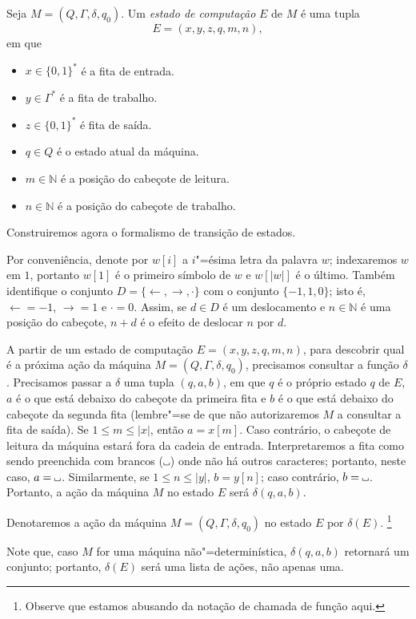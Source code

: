 \begin{definition}
    Seja $M = (Q, \Gamma, \delta, q_0)$.
    Um \emph{estado de computação} $E$ de $M$ é uma tupla
    \begin{equation*}
        E = (x, y, z, q, m, n),
    \end{equation*}
    em que
    \begin{itemize}
        \setlength{\labelsep}{1ex}
        \item $x \in \{0, 1\}^*$ é a fita de entrada.
        \item $y \in \Gamma^*$ é a fita de trabalho.
        \item $z \in \{0, 1\}^*$ é fita de saída.
        \item $q \in Q$ é o estado atual da máquina.
        \item $m \in \mathbb N$ é a posição do cabeçote de leitura.
        \item $n \in \mathbb N$ é a posição do cabeçote de trabalho.
    \end{itemize}
\end{definition}

Construiremos agora o formalismo de transição de estados.

Por conveniência, denote por $w[i]$ a $i$"=ésima letra da palavra $w$;
indexaremos $w$ em $1$,
portanto $w[1]$ é o primeiro símbolo de $w$ e $w[|w|]$ é o último.
Também identifique o conjunto $D = \{\leftarrow, \rightarrow, \cdot\}$
com o conjunto $\{-1, 1, 0\}$;
isto é, $\leftarrow = -1$, $\rightarrow = 1$ e $\cdot = 0$.
Assim, se $d \in D$ é um deslocamento
e $n \in \mathbb N$ é uma posição do cabeçote,
$n + d$ é o efeito de deslocar $n$ por $d$.

A partir de um estado de computação $E = (x, y, z, q, m, n)$,
para descobrir qual é a próxima ação da máquina $M = (Q, \Gamma, \delta, q_0)$,
precisamos consultar a função $\delta$.
Precisamos passar a $\delta$ uma tupla $(q, a, b)$,
em que $q$ é o próprio estado $q$ de $E$,
$a$ é o que está debaixo do cabeçote da primeira fita
e $b$ é o que está debaixo do cabeçote da segunda fita
(lembre"=se de que não autorizaremos $M$ a consultar a fita de saída).
Se $1 \leq m \leq |x|$,
então $a = x[m]$.
Caso contrário, o cabeçote de leitura da máquina
estará fora da cadeia de entrada.
Interpretaremos a fita como sendo preenchida com brancos ($\B$)
onde não há outros caracteres;
portanto, neste caso, $a = \B$.
Similarmente, se $1 \leq n \leq |y|$, $b = y[n]$; caso contrário, $b = \B$.
Portanto,
a ação da máquina $M$ no estado $E$
será $\delta(q, a, b)$.
\begin{notation}
    Denotaremos a ação da máquina $M = (Q, \Gamma, \delta, q_0)$
    no estado $E$ por $\delta(E)$.%
    \footnote{
        Observe que estamos abusando da notação de chamada de função aqui.
    }
\end{notation}
Note que,
caso $M$ for uma máquina não"=determinística,
$\delta(q, a, b)$ retornará um conjunto;
portanto, $\delta(E)$ será uma lista de ações,
não apenas uma.

